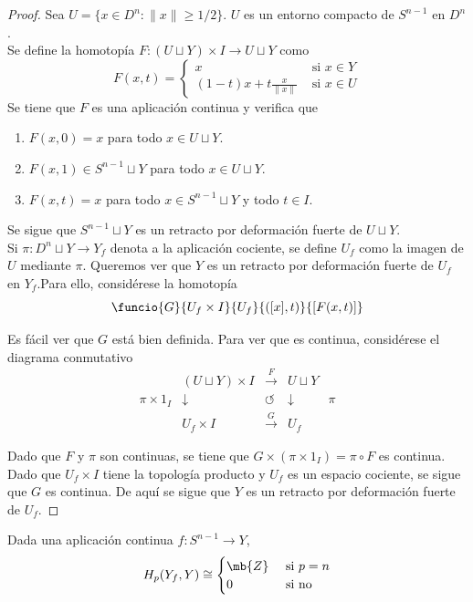 \begin{proof}
Sea $U=\{x \in D^n: \|x\| \geq 1/2\}$. $U$ es un entorno compacto de $S^{n-1}$ en $D^n$.
\\

Se define la homotopía $F: (U \sqcup Y)\times I \longrightarrow U\sqcup Y$ como $$F(x,t)=\begin{cases}x &\mbox{ si }x \in Y \\(1-t)x+t\frac{x}{\|x\|} &\mbox{ si }x \in U\end{cases}$$ Se tiene que $F$ es una aplicación continua y verifica que
\begin{enumerate}
\item $F(x,0)=x$ para todo $x \in U\sqcup Y$.
\item $F(x,1) \in S^{n-1}\sqcup Y$ para todo $x \in U \sqcup Y$.
\item $F(x,t)=x$ para todo $x \in S^{n-1}\sqcup Y$ y todo $t \in I$.
\end{enumerate}
Se sigue que $S^{n-1}\sqcup Y$ es un retracto por deformación fuerte de $U\sqcup Y$.
\\

Si $\pi: D^n \sqcup Y \longrightarrow Y_f$ denota a la aplicación cociente, se define $U_f$ como la imagen de $U$ mediante $\pi$. Queremos ver que $Y$ es un retracto por deformación fuerte de $U_f$ en $Y_f$.Para ello, considérese la homotopía $$\funcio{G}{U_f\times I}{U_f}{([x],t)}{[F(x,t)]}$$

Es fácil ver que $G$ está bien definida. Para ver que es continua, considérese el diagrama conmutativo
$$\begin{array}{ccccc}
&(U\sqcup Y)\times I&\xrightarrow{F}	& U\sqcup Y&\\
\pi\times 1_I&\downarrow			 & \circlearrowleft	& \downarrow&\pi\\
&U_f\times I & \xrightarrow{G}&U_f&
\end{array}$$

Dado que $F$ y $\pi$ son continuas, se tiene que $G\times (\pi\times 1_I)=\pi\circ F$ es continua. Dado que $U_f\times I$ tiene la topología producto y $U_f$ es un espacio cociente, se sigue que $G$ es continua. De aquí se sigue que $Y$ es un retracto por deformación fuerte de $U_f$.
\end{proof}

\begin{prop}Dada una aplicación continua $f: S^{n-1} \longrightarrow Y$, $$H_p(Y_f,Y)\cong\begin{cases}\mb{Z} & \mbox{ si }p=n \\ 0 & \mbox{ si no}\end{cases}$$\end{prop}

